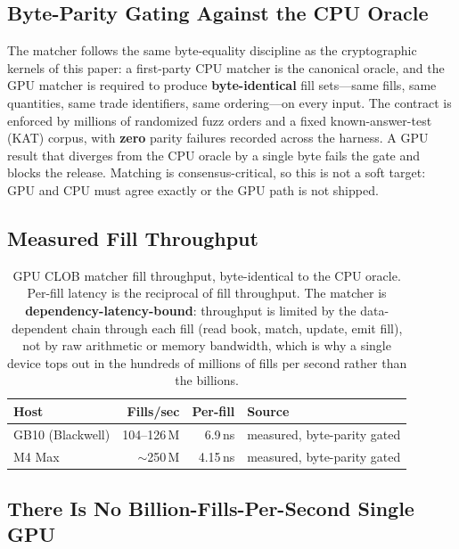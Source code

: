 \subsection{Byte-Parity Gating Against the CPU Oracle}

The matcher follows the same byte-equality discipline as the
cryptographic kernels of this paper: a first-party CPU matcher is the
canonical oracle, and the GPU matcher is required to
produce \textbf{byte-identical} fill sets---same fills, same quantities,
same trade identifiers, same ordering---on every input. The contract is
enforced by millions of randomized fuzz orders and a fixed
known-answer-test (KAT) corpus, with \textbf{zero} parity failures
recorded across the harness. A GPU result that diverges from the CPU
oracle by a single byte fails the gate and blocks the release. Matching
is consensus-critical, so this is not a soft target: GPU and CPU must
agree exactly or the GPU path is not shipped.

\subsection{Measured Fill Throughput}

\begin{table}[h]
\centering
\small
\begin{tabular}{lrrl}
\toprule
\textbf{Host} & \textbf{Fills/sec} & \textbf{Per-fill} & \textbf{Source} \\
\midrule
GB10 (Blackwell) & 104--126\,M & 6.9\,ns  & measured, byte-parity gated \\
M4 Max           & $\sim$250\,M  & 4.15\,ns & measured, byte-parity gated \\
\bottomrule
\end{tabular}
\caption{GPU CLOB matcher fill throughput, byte-identical to the CPU
oracle. Per-fill latency is the reciprocal of fill throughput. The matcher
is \textbf{dependency-latency-bound}: throughput is limited by the
data-dependent chain through each fill (read book, match, update,
emit fill), not by raw arithmetic or memory bandwidth, which is why a
single device tops out in the hundreds of millions of fills per second
rather than the billions.}
\label{tab:clob-throughput}
\end{table}

\subsection{There Is No Billion-Fills-Per-Second Single GPU}

